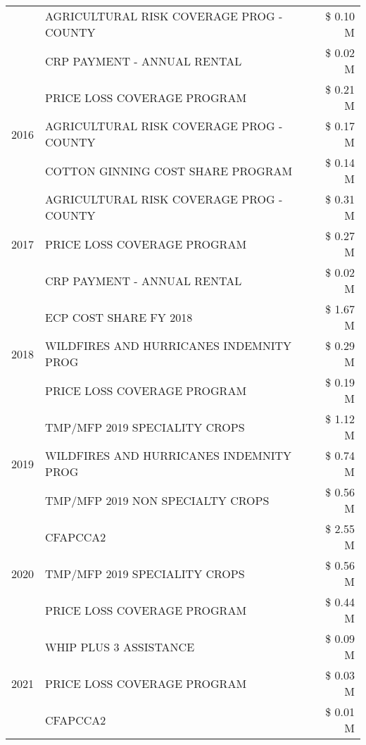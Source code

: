 \begin{tabular}{llr}
 & AGRICULTURAL RISK COVERAGE PROG - COUNTY & \$ 0.10 M \\
 & CRP PAYMENT - ANNUAL RENTAL & \$ 0.02 M \\
\cline{1-3}
\multirow[t]{3}{*}{2016} & PRICE LOSS COVERAGE PROGRAM                   & \$ 0.21 M \\
 & AGRICULTURAL RISK COVERAGE PROG - COUNTY      & \$ 0.17 M \\
 & COTTON GINNING COST SHARE PROGRAM             & \$ 0.14 M \\
\cline{1-3}
\multirow[t]{3}{*}{2017} & AGRICULTURAL RISK COVERAGE PROG - COUNTY & \$ 0.31 M \\
 & PRICE LOSS COVERAGE PROGRAM & \$ 0.27 M \\
 & CRP PAYMENT - ANNUAL RENTAL & \$ 0.02 M \\
\cline{1-3}
\multirow[t]{3}{*}{2018} & ECP COST SHARE FY 2018 & \$ 1.67 M \\
 & WILDFIRES AND HURRICANES INDEMNITY PROG & \$ 0.29 M \\
 & PRICE LOSS COVERAGE PROGRAM & \$ 0.19 M \\
\cline{1-3}
\multirow[t]{3}{*}{2019} & TMP/MFP 2019 SPECIALITY CROPS & \$ 1.12 M \\
 & WILDFIRES AND HURRICANES INDEMNITY PROG & \$ 0.74 M \\
 & TMP/MFP 2019 NON SPECIALTY CROPS & \$ 0.56 M \\
\cline{1-3}
\multirow[t]{3}{*}{2020} & CFAPCCA2 & \$ 2.55 M \\
 & TMP/MFP 2019 SPECIALITY CROPS & \$ 0.56 M \\
 & PRICE LOSS COVERAGE PROGRAM & \$ 0.44 M \\
\cline{1-3}
\multirow[t]{3}{*}{2021} & WHIP PLUS 3 ASSISTANCE & \$ 0.09 M \\
 & PRICE LOSS COVERAGE PROGRAM & \$ 0.03 M \\
 & CFAPCCA2 & \$ 0.01 M \\
\cline{1-3}
\bottomrule
\end{tabular}
